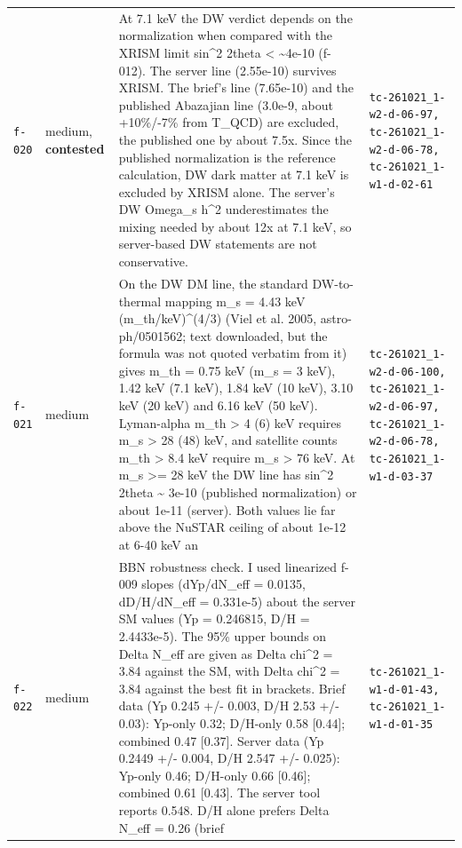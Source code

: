 \documentclass[11pt,a4paper]{article}
\begin{document}
\begin{longtable}{@{}p{}p{}p{}p{}@{}}
\texttt{f-020} & medium, \textbf{contested} & At 7.1 keV the DW verdict depends on the normalization when compared with the XRISM limit sin\textasciicircum{}2 2theta \textless{} \textasciitilde{}4e-10 (f-012). The server line (2.55e-10) survives XRISM. The brief's line (7.65e-10) and the published Abazajian line (3.0e-9, about +10\%/-7\% from T\_QCD) are excluded, the published one by about 7.5x. Since the published normalization is the reference calculation, DW dark matter at 7.1 keV is excluded by XRISM alone. The server's DW Omega\_s h\textasciicircum{}2 underestimates the mixing needed by about 12x at 7.1 keV, so server-based DW statements are not conservative. & \texttt{tc-261021\_\allowbreak{}1-w2-d-06-97,\allowbreak{} tc-261021\_\allowbreak{}1-w2-d-06-78,\allowbreak{} tc-261021\_\allowbreak{}1-w1-d-02-61} \\
\texttt{f-021} & medium & On the DW DM line, the standard DW-to-thermal mapping m\_s = 4.43 keV (m\_th/keV)\textasciicircum{}(4/3) (Viel et al. 2005, astro-ph/0501562; text downloaded, but the formula was not quoted verbatim from it) gives m\_th = 0.75 keV (m\_s = 3 keV), 1.42 keV (7.1 keV), 1.84 keV (10 keV), 3.10 keV (20 keV) and 6.16 keV (50 keV). Lyman-alpha m\_th \textgreater{} 4 (6) keV requires m\_s \textgreater{} 28 (48) keV, and satellite counts m\_th \textgreater{} 8.4 keV require m\_s \textgreater{} 76 keV. At m\_s \textgreater{}= 28 keV the DW line has sin\textasciicircum{}2 2theta \textasciitilde{} 3e-10 (published normalization) or about 1e-11 (server). Both values lie far above the NuSTAR ceiling of about 1e-12 at 6-40 keV an & \texttt{tc-261021\_\allowbreak{}1-w2-d-06-100,\allowbreak{} tc-261021\_\allowbreak{}1-w2-d-06-97,\allowbreak{} tc-261021\_\allowbreak{}1-w2-d-06-78,\allowbreak{} tc-261021\_\allowbreak{}1-w1-d-03-37} \\
\texttt{f-022} & medium & BBN robustness check. I used linearized f-009 slopes (dYp/dN\_eff = 0.0135, dD/H/dN\_eff = 0.331e-5) about the server SM values (Yp = 0.246815, D/H = 2.4433e-5). The 95\% upper bounds on Delta N\_eff are given as Delta chi\textasciicircum{}2 = 3.84 against the SM, with Delta chi\textasciicircum{}2 = 3.84 against the best fit in brackets. Brief data (Yp 0.245 +/- 0.003, D/H 2.53 +/- 0.03): Yp-only 0.32; D/H-only 0.58 [0.44]; combined 0.47 [0.37]. Server data (Yp 0.2449 +/- 0.004, D/H 2.547 +/- 0.025): Yp-only 0.46; D/H-only 0.66 [0.46]; combined 0.61 [0.43]. The server tool reports 0.548. D/H alone prefers Delta N\_eff = 0.26 (brief & \texttt{tc-261021\_\allowbreak{}1-w1-d-01-43,\allowbreak{} tc-261021\_\allowbreak{}1-w1-d-01-35} \\

\end{longtable}
\end{document}
